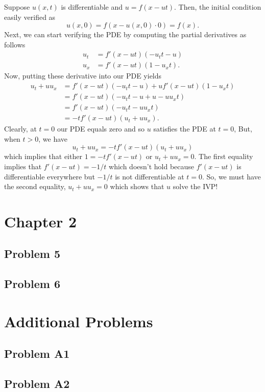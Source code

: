 \documentclass[a4paper,12pt]{article}
\begin{document}
    Suppose $ u(x,t) $ is differentiable and $ u = f(x - ut) $. Then, the initial condition easily verified as
    \[
    	u(x,0) = f(x - u(x,0) \cdot 0) = f(x).
    \]
    Next, we can start verifying the PDE by computing the partial derivatives as follows
    \begin{align*}
        u_t &= f'(x - u t) (-u_t t - u) \\
        u_x &= f'(x - ut) (1 - u_x t).
    \end{align*}
    Now, putting these derivative into our PDE yields
    \begin{align*}
        u_t + u u_x &= f'(x - u t) (-u_t t - u) + u f'(x - ut) (1 - u_x t) \\
        &= f'(x - ut) (-u_t t - u + u - u u_x t) \\
        &= f'(x - ut) (-u_t t - u u_x t) \\
        &= -t f'(x - ut) (u_t + u u_x).
    \end{align*}
Clearly, at $ t = 0 $ our PDE equals zero and so $ u $ satisfies the PDE at $ t = 0 $, But, when $ t > 0 $, we have
\[
    u_t + u u_x = -t f'(x - ut) (u_t + u u_x)
\]
which implies that either $ 1 = -t f'(x - ut)  $ or $ u_t + u u_x = 0 $. The first equality implies that $ f'(x - ut) = -1/t $ which doesn't hold because $ f'(x - ut) $ is differentiable everywhere but $ - 1/t $ is not differentiable at $ t = 0 $. So, we must have the second equality, $ u_t + u u_x = 0 $ which shows that $ u $ solve the IVP!

\section*{Chapter 2}
\subsection*{Problem 5}

\subsection*{Problem 6}

\section*{Additional Problems}
\subsection*{Problem A1}

\subsection*{Problem A2}
\end{document}
